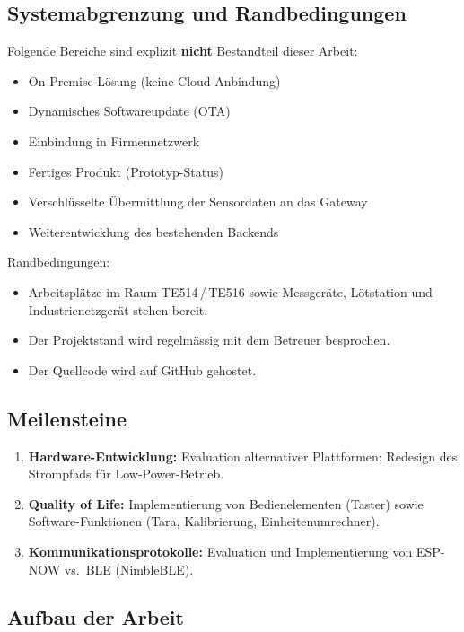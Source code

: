 \documentclass[12pt,a4paper]{article}
\begin{document}
	\subsection{Systemabgrenzung und Randbedingungen}

	Folgende Bereiche sind explizit \textbf{nicht} Bestandteil dieser Arbeit:
	\begin{itemize}
		\item On-Premise-Lösung (keine Cloud-Anbindung)
		\item Dynamisches Softwareupdate (OTA)
		\item Einbindung in Firmennetzwerk
		\item Fertiges Produkt (Prototyp-Status)
		\item Verschlüsselte Übermittlung der Sensordaten an das Gateway
		\item Weiterentwicklung des bestehenden Backends
	\end{itemize}

	\noindent Randbedingungen:
	\begin{itemize}
		\item Arbeitsplätze im Raum TE514\,/\,TE516 sowie Messgeräte, Lötstation und Industrienetzgerät stehen bereit.
		\item Der Projektstand wird regelmässig mit dem Betreuer besprochen.
		\item Der Quellcode wird auf GitHub gehostet.
	\end{itemize}

	\subsection{Meilensteine}

	\begin{enumerate}
		\item \textbf{Hardware-Entwicklung:} Evaluation alternativer Plattformen; Redesign des Strompfads für Low-Power-Betrieb.
		\item \textbf{Quality of Life:} Implementierung von Bedienelementen (Taster) sowie Software-Funktionen (Tara, Kalibrierung, Einheitenumrechner).
		\item \textbf{Kommunikationsprotokolle:} Evaluation und Implementierung von ESP-NOW vs.\ BLE (NimbleBLE).
	\end{enumerate}

	\subsection{Aufbau der Arbeit}
\end{document}
